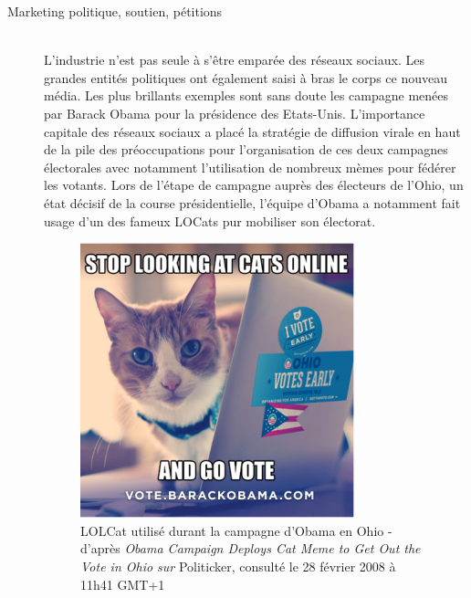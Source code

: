 \begin{description}
\newpage
\item[Marketing politique, soutien, pétitions]
\hfill \\
L{\textquoteright}industrie n{\textquoteright}est pas seule à s{\textquoteright}être emparée des réseaux sociaux. Les grandes entités politiques ont également saisi à bras le corps ce nouveau média. Les plus brillants exemples sont sans doute les campagne menées par Barack Obama pour la présidence des Etats-Unis. L{\textquoteright}importance capitale des réseaux sociaux a placé la stratégie de diffusion virale en haut de la pile des préoccupations pour l{\textquoteright}organisation de ces deux campagnes électorales \citep{Miller2008} avec notamment l{\textquoteright}utilisation de nombreux mèmes pour fédérer les votants. Lors de l{\textquoteright}étape de campagne auprès des électeurs de l{\textquoteright}Ohio, un état décisif de la course présidentielle, l{\textquoteright}équipe d{\textquoteright}Obama a notamment fait usage d{\textquoteright}un des fameux LOCats pur mobiliser son électorat. 


\begin{figure}[htpb]
    \centering
    \includegraphics[scale=0.8]{figures/chap2/chapitre2-img16.png}
    \caption[Lolcat utilisé lors la campagne d'Obama]{ 
        LOLCat utilisé durant la campagne d{\textquoteright}Obama en Ohio - d{\textquoteright}après \textit{Obama Campaign Deploys Cat Meme to Get Out the Vote in Ohio sur }Politicker, consulté le 28 février 2008 à 11h41 GMT+1
    } 
    \label{fig:obama-cat}
\end{figure}


\end{description}
